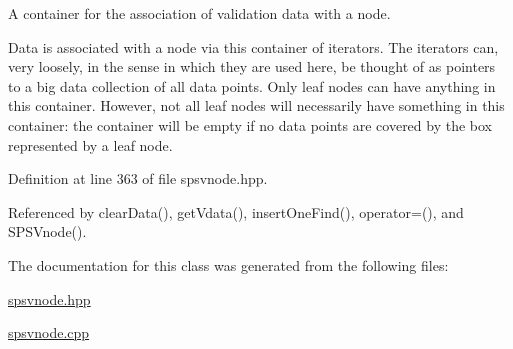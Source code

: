 \-A container for the association of validation data with a node. 

\-Data is associated with a node via this container of iterators. \-The iterators can, very loosely, in the sense in which they are used here, be thought of as pointers to a big data collection of all data points. \-Only leaf nodes can have anything in this container. \-However, not all leaf nodes will necessarily have something in this container\-: the container will be empty if no data points are covered by the box represented by a leaf node. 

\-Definition at line 363 of file spsvnode.\-hpp.



\-Referenced by clear\-Data(), get\-Vdata(), insert\-One\-Find(), operator=(), and \-S\-P\-S\-Vnode().



\-The documentation for this class was generated from the following files\-:\begin{DoxyCompactItemize}
\item 
\hyperlink{spsvnode_8hpp}{spsvnode.\-hpp}\item 
\hyperlink{spsvnode_8cpp}{spsvnode.\-cpp}\end{DoxyCompactItemize}

